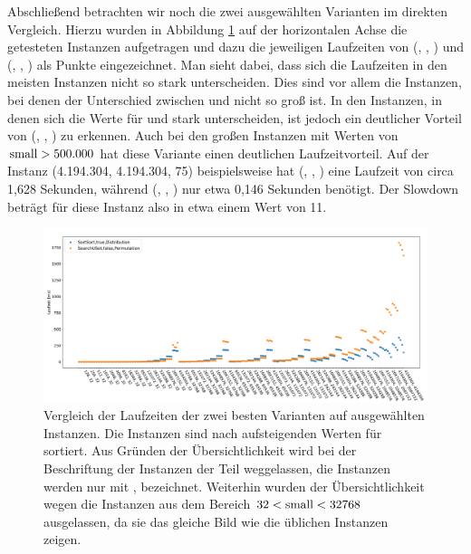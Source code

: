 Abschließend betrachten wir noch die zwei ausgewählten Varianten im direkten Vergleich. Hierzu wurden
in Abbildung \ref{fig:messung_small} auf der horizontalen Achse die getesteten Instanzen aufgetragen
und dazu die jeweiligen Laufzeiten von (\SorSor, \true, \distr) und (\SeaUSet, \false, \perm) als Punkte
eingezeichnet. 
Man sieht dabei, dass sich die Laufzeiten in den meisten Instanzen nicht so stark unterscheiden.
Dies sind vor allem die Instanzen, bei denen der Unterschied zwischen \la{} und \sm{} nicht so groß ist.
In den Instanzen, in denen sich die Werte für \sm{} und \la{} stark unterscheiden, ist jedoch ein 
deutlicher Vorteil von (\SorSor, \true, \distr) zu erkennen. Auch bei den \glqq großen\grqq{} Instanzen
mit Werten von $\text{small{}}> 500.000$ hat diese Variante einen deutlichen Laufzeitvorteil.
Auf der Instanz (4.194.304, 4.194.304, 75) beispielsweise hat (\SeaUSet, \false, \perm) eine Laufzeit
von circa 1,628 Sekunden, während (\SorSor, \true, \distr) nur etwa 0,146 Sekunden benötigt. Der Slowdown
beträgt für diese Instanz also in etwa einem Wert von 11. 
\begin{figure}
\centering
	\includegraphics[width = \textwidth]{figures/small_aufsteigend.pdf}
	\caption[Laufzeitvergleich der zwei besten Varianten auf ausgewählten Instanzen] {Vergleich der Laufzeiten der zwei besten Varianten auf ausgewählten Instanzen.
			Die Instanzen sind nach aufsteigenden Werten für \sm{} sortiert. Aus Gründen der Übersichtlichkeit
wird bei  der Beschriftung der Instanzen der Teil \fr{} weggelassen, die Instanzen werden 
nur mit \la{}, \sm{} bezeichnet. Weiterhin wurden der
Übersichtlichkeit wegen die Instanzen aus dem Bereich $32 < \text{small}  <32768$ ausgelassen, da sie das gleiche
Bild wie die üblichen Instanzen zeigen.}
	\label{fig:messung_small}
\end{figure}


